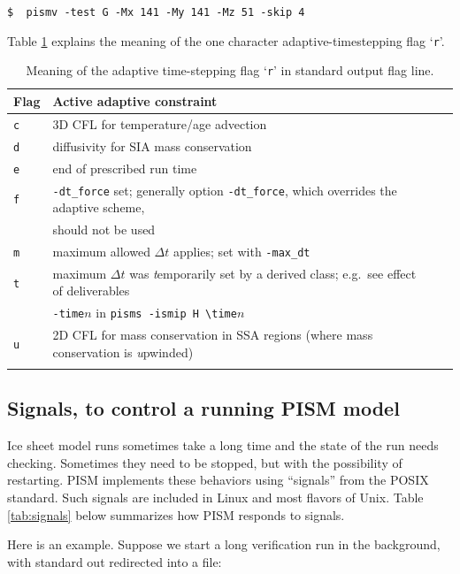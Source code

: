 \documentclass[11pt,final]{amsart}
\begin{document}
\verb|$  pismv -test G -Mx 141 -My 141 -Mz 51 -skip 4|

Table \ref{tab:adaptiveflag} explains the meaning of the one character adaptive-timestepping flag `\verb|r|'.

\begin{table}[ht]
\caption{Meaning of the adaptive time-stepping flag `\texttt{r}' in standard output flag line.}\label{tab:adaptiveflag}
\begin{tabular}{@{}llll}\hline
\textbf{Flag} & \textbf{Active adaptive constraint} \\ \hline
\verb|c| & 3D CFL for temperature/age advection \cite{BBL} \\
\verb|d| & diffusivity for SIA mass conservation \cite{BBL} \\
\verb|e| & end of prescribed run time \\
\verb|f| & \verb|-dt_force| set; generally option \verb|-dt_force|, which overrides the adaptive scheme, \\
 & should not be used  \\
\verb|m| & maximum allowed $\Delta t$ applies; set with \verb|-max_dt| \\
\verb|t| & maximum $\Delta t$ was \emph{t}emporarily set by a derived class; e.g.~see effect of deliverables \\
 & \verb|-time|$n$ in \verb|pisms -ismip H \time|$n$ \\
\verb|u| & 2D CFL for mass conservation in SSA regions (where mass conservation is \emph{u}pwinded)\\
\hline
\normalsize
\end{tabular}
\end{table}


\subsection{Signals, to control a running PISM model} \label{subsect:signal}    Ice sheet model runs sometimes take a long time and the state of the run needs checking.  Sometimes they need to be stopped, but with the possibility of restarting.  PISM implements these behaviors using ``signals'' from the POSIX standard.  Such signals are included in Linux and most flavors of Unix.  Table \ref{tab:signals} below summarizes how PISM responds to signals.

Here is an example.  Suppose we start a long verification run in the background, with standard out redirected into a file:
\end{document}
